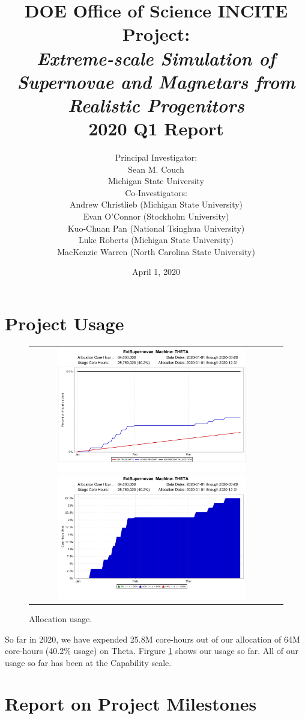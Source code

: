 \documentclass[12pt,titlepage]{article}
\title{DOE Office of Science INCITE Project:\\
{\it Extreme-scale Simulation of Supernovae and Magnetars from Realistic Progenitors}\\
2020 Q1 Report}
\author{Principal Investigator:\\Sean M. Couch\\
  Michigan State University \vspace{0.1in}\\
  Co-Investigators: \\
  Andrew Christlieb (Michigan State University) \\
  Evan O'Connor (Stockholm University)\\
  Kuo-Chuan Pan (National Tsinghua University) \\
  Luke Roberts (Michigan State University) \\
  MacKenzie Warren (North Carolina State University) \\
}
\date{April 1, 2020}
\begin{document}
\maketitle


\section{Project Usage}



\begin{figure}
  \begin{tabular}{cc}
    \includegraphics[width=3.25in]{on_track_graph}
    \includegraphics[width=3.25in]{categorized_hours_graph} 
  \end{tabular}
  \caption{Allocation usage.}
  \label{fig:usage}
\end{figure}

So far in 2020, we have expended 25.8M core-hours out of our allocation of 64M core-hours (40.2\% usage) on Theta. Firgure \ref{fig:usage} shows our usage so far. All of our usage so far has been at the Capability scale. 

\section{Report on Project Milestones}
\end{document}
